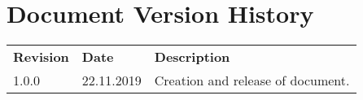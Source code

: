 \chapter*{Document Version History}
\label{ch:versionhistory}
\begin{table}[h]
\begin{tabular}{lll}
\textbf{Revision} & \textbf{Date} & \textbf{Description}              \\
1.0.0             & 22.11.2019    & Creation and release of document.
\end{tabular}
\end{table}